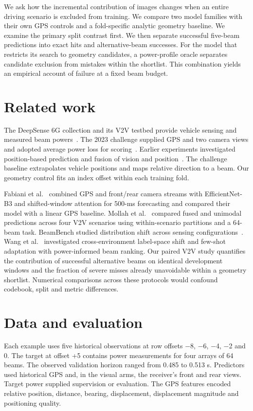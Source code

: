 \documentclass[10pt,journal,letterpaper]{IEEEtran}
\begin{document}
We ask how the incremental contribution of images changes when an entire driving scenario is excluded from training. We compare two model families with their own GPS controls and a fold-specific analytic geometry baseline. We examine the primary split contrast first. We then separate successful five-beam predictions into exact hits and alternative-beam successes. For the model that restricts its search to geometry candidates, a power-profile oracle separates candidate exclusion from mistakes within the shortlist. This combination yields an empirical account of failure at a fixed beam budget.

\section{Related work}

The DeepSense 6G collection and its V2V testbed provide vehicle sensing and measured beam powers~\cite{deep,v2v}. The 2023 challenge supplied GPS and two camera views and adopted average power loss for scoring~\cite{challenge}. Earlier experiments investigated position-based prediction and fusion of vision and position~\cite{position,vision}. The challenge baseline extrapolates vehicle positions and maps relative direction to a beam. Our geometry control fits an index offset within each training fold.

Fabiani et al.~\cite{fabiani} combined GPS and front/rear camera streams with EfficientNet-B3 and shifted-window attention for 500-ms forecasting and compared their model with a linear GPS baseline. Mollah et al.~\cite{mollah} compared fused and unimodal predictions across four V2V scenarios using within-scenario partitions and a 64-beam task. BeamBench studied distribution shift across sensing configurations~\cite{arnold}. Wang et al.~\cite{wang} investigated cross-environment label-space shift and few-shot adaptation with power-informed beam ranking. Our paired V2V study quantifies the contribution of successful alternative beams on identical development windows and the fraction of severe misses already unavoidable within a geometry shortlist. Numerical comparisons across these protocols would confound codebook, split and metric differences.

\section{Data and evaluation}

Each example uses five historical observations at row offsets \ensuremath{-}8, \ensuremath{-}6, \ensuremath{-}4, \ensuremath{-}2 and 0. The target at offset +5 contains power measurements for four arrays of 64 beams. The observed validation horizon ranged from 0.485 to 0.513 s. Predictors used historical GPS and, in the visual arms, the receiver's front and rear views. Target power supplied supervision or evaluation. The GPS features encoded relative position, distance, bearing, displacement, displacement magnitude and positioning quality.
\end{document}
